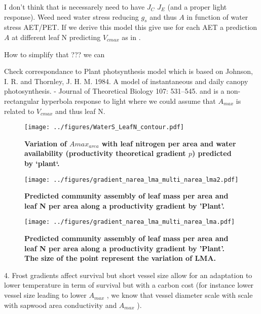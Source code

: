 \documentclass[a4paper,11pt]{article}
\begin{document}
I don't think that is necessarely need to have $J_C$ $J_E$ (and a
proper light response). Weed need water stress reducing $g_s$ and thus $A$ in function of water stress AET/PET. If we derive this model this give use for each AET a prediction $A$ at different leaf N predicting $V_{cmax}$ as in \citet{Sakschewski-2015}.

How to simplify that ??? we can


Check correspondance to Plant photsynthesis model which is based on Johnson, I. R. and Thornley, J. H. M. 1984. A model of instantaneous and daily canopy photosynthesis. - Journal of Theoretical Biology 107: 531–545.
 and is a non-rectangular hyperbola response to light where we could assume that $A_{max}$ is related to $V_{cmax}$ and thus leaf N.





\begin{figure}[ht]
\centering
\texttt{[image: ../figures/WaterS\_LeafN\_contour.pdf]}
\caption{\textbf{Variation of $A{max}_{area}$ with leaf nitrogen per area and water availability (productivity theoretical gradient $p$) predicted by `plant`.}
\label{fig:leafN_water}}
\end{figure}


\begin{figure}[ht]
\centering
\texttt{[image: ../figures/gradient\_narea\_lma\_multi\_narea\_lma2.pdf]}
\caption{\textbf{Predicted community assembly of leaf mass per area and leaf N per area along a productivity gradient by 'Plant'.}
\label{fig:lma_mat_o_map}}
\end{figure}

\begin{figure}[ht]
\centering
\texttt{[image: ../figures/gradient\_narea\_lma\_multi\_narea\_lma.pdf]}
\caption{\textbf{Predicted community assembly of leaf mass per area and leaf N per area along a productivity gradient by 'Plant'. The size of the point represent the variation of LMA.}
\label{fig:lma_mat_o_map}}
\end{figure}

\clearpage

4. Frost gradients affect survival but
short vessel size allow for an adaptation to lower temperature in term
of survival but
with a carbon cost (for instance lower vessel size leading to lower
$A_{max}$ \citep{Poorter-2010}, we know that vessel diameter scale with scale with sapwood area conductivity and $A_{max}$ \citep{Chen-2009,Choat-2011}).
\end{document}
